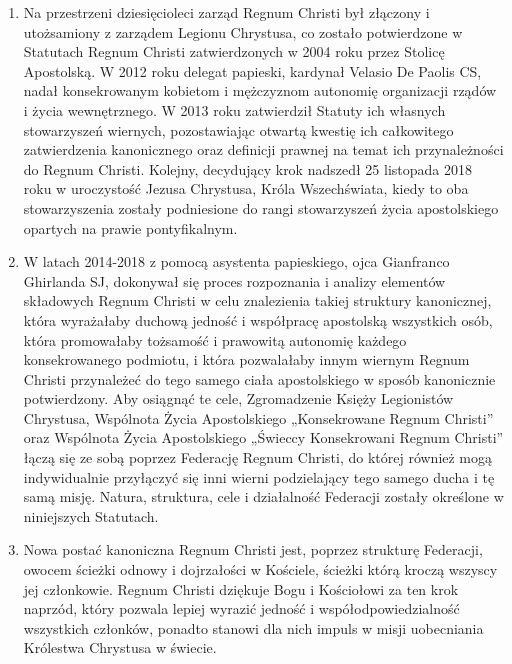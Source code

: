 \begin{enumerate}
\item Na przestrzeni dziesięcioleci zarząd Regnum Christi był złączony i utożsamiony z zarządem Legionu Chrystusa, co zostało potwierdzone w Statutach Regnum Christi zatwierdzonych w 2004 roku przez Stolicę Apostolską. W 2012 roku delegat papieski, kardynał Velasio De Paolis CS, nadał konsekrowanym kobietom i mężczyznom autonomię organizacji rządów i życia wewnętrznego. W 2013 roku zatwierdził Statuty ich własnych stowarzyszeń wiernych, pozostawiając otwartą kwestię ich całkowitego zatwierdzenia kanonicznego oraz definicji prawnej na temat ich przynależności do Regnum Christi. Kolejny, decydujący krok nadszedł 25 listopada 2018 roku w uroczystość Jezusa Chrystusa, Króla Wszechświata, kiedy to oba stowarzyszenia zostały podniesione do rangi stowarzyszeń życia apostolskiego opartych na prawie pontyfikalnym.


\item W latach 2014-2018 z pomocą asystenta papieskiego, ojca Gianfranco Ghirlanda SJ, dokonywał się proces rozpoznania i analizy elementów składowych Regnum Christi w celu znalezienia takiej struktury kanonicznej, która wyrażałaby duchową jedność i współpracę apostolską wszystkich osób, która promowałaby tożsamość i prawowitą autonomię każdego konsekrowanego podmiotu, i która pozwalałaby innym wiernym Regnum Christi przynależeć do tego samego ciała apostolskiego w sposób kanonicznie potwierdzony. Aby osiągnąć te cele, Zgromadzenie Księży Legionistów Chrystusa, Wspólnota Życia Apostolskiego „Konsekrowane Regnum Christi” oraz Wspólnota Życia Apostolskiego „Świeccy Konsekrowani Regnum Christi” łączą się ze sobą poprzez Federację Regnum Christi, do której również mogą indywidualnie przyłączyć się inni wierni podzielający tego samego ducha i tę samą misję. Natura, struktura, cele i działalność Federacji zostały określone w niniejszych Statutach.


\item Nowa postać kanoniczna Regnum Christi jest, poprzez strukturę Federacji, owocem ścieżki odnowy i dojrzałości w Kościele, ścieżki którą kroczą wszyscy jej członkowie. Regnum Christi dziękuje Bogu i Kościołowi za ten krok naprzód, który pozwala lepiej wyrazić jedność i współodpowiedzialność wszystkich członków, ponadto stanowi dla nich impuls w misji uobecniania Królestwa Chrystusa w świecie.


\end{enumerate}




